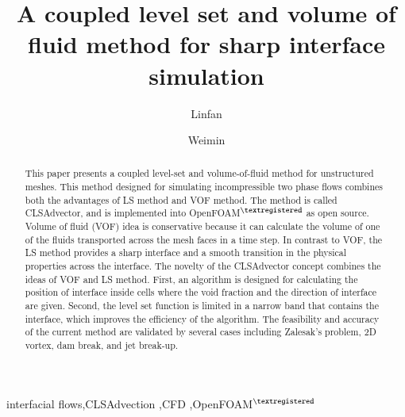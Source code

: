 \documentclass[times,final]{elsarticle}
\begin{document}

\begin{frontmatter}

\title{A coupled level set and volume of fluid method for sharp interface simulation}%

\author[1]{Linfan }
\author[1]{Weimin }

\address[1]{Affiliation 1, Address, City and Postal Code, China}
\address[2]{Affiliation 2, Address, City and Postal Code, Country}



\begin{abstract}
 This paper presents a coupled level-set and volume-of-fluid method for unstructured meshes. This method designed for simulating incompressible two phase flows combines both the advantages of LS method and VOF method. The method is called CLSAdvector, and is implemented into OpenFOAM$^{\textregistered}$ as open source. Volume of fluid (VOF) idea is conservative because it can calculate the volume of one of the fluids transported across the mesh faces in a time step. In contrast to VOF, the LS method provides a sharp interface and a smooth transition in the physical properties across the interface. The novelty of the CLSAdvector concept combines the ideas of VOF and LS method. First, an algorithm is designed for calculating the position of interface inside cells where the void fraction and the direction of interface are given. Second, the level set function is limited in a narrow band that contains the interface, which improves the efficiency of the algorithm. The feasibility and accuracy of the current method are validated by several cases including Zalesak's problem, 2D vortex, dam break, and jet break-up.
\end{abstract}
\begin{keyword}
interfacial flows\sep CLSAdvection \sep CFD \sep OpenFOAM$^{\textregistered}$
\end{keyword}

\end{frontmatter}










\end{document}
